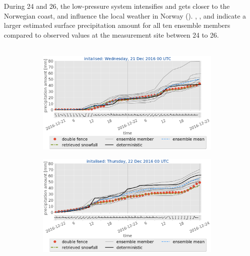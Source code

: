 During \num{24} and \SI{26}{\dec}, the low-pressure system intensifies and gets closer to the Norwegian coast, and influence the local weather in Norway (). , , and  indicate a larger estimated surface precipitation amount for all ten ensemble members compared to observed values at the measurement site between \num{24} to \SI{26}{\dec}. 
\\ 
\\
\begin{figure}[H]
	\centering
	\begin{subfigure}[t]{0.85\textwidth}		\includegraphics[trim={0.cm 5.2cm 0.cm 0cm},clip,width=\textwidth]{./fig_sfc_acc/acc_wind_20161221_00}
		\caption{}\label{fig:sfc_acc21}
	\end{subfigure}
	\begin{subfigure}[t]{0.85\textwidth}		\includegraphics[trim={0.cm 5.2cm 0.cm 0cm},clip,width=\textwidth]{./fig_sfc_acc/acc_wind_20161222_00}
		\caption{}\label{fig:sfc_acc22}
	\end{subfigure}

\end{figure}
